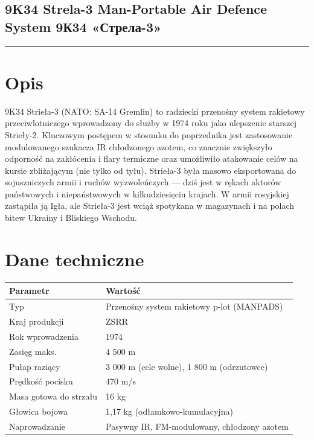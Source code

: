 \documentclass[12pt,openany,oneside]{book}
\begin{document}
\subsection{9K34 Strela-3 Man-Portable Air Defence System \textbar{}
9К34
«Стрела-3»}\label{k34-strela-3-man-portable-air-defence-system-9ux43a34-ux441ux442ux440ux435ux43bux430-3}

\begin{center}\rule{0.5\linewidth}{0.5pt}\end{center}

\section{Opis}\label{opis-31}

9K34 Strieła-3 (NATO: SA-14 Gremlin) to radziecki przenośny system
rakietowy przeciwlotniczego wprowadzony do służby w 1974 roku jako
ulepszenie starszej Strieły-2. Kluczowym postępem w stosunku do
poprzednika jest zastosowanie modulowanego szukacza IR chłodzonego
azotem, co znacznie zwiększyło odporność na zakłócenia i flary termiczne
oraz umożliwiło atakowanie celów na kursie zbliżającym (nie tylko od
tyłu). Strieła-3 była masowo eksportowana do sojuszniczych armii i
ruchów wyzwoleńczych --- dziś jest w rękach aktorów państwowych i
niepaństwowych w kilkudziesięciu krajach. W armii rosyjskiej zastąpiła
ją Igła, ale Strieła-3 jest wciąż spotykana w magazynach i na polach
bitew Ukrainy i Bliskiego Wschodu.

\section{Dane techniczne}\label{dane-techniczne-31}

\begin{longtable}[]{@{}ll@{}}
\toprule\noalign{}
Parametr & Wartość \\
\midrule\noalign{}
\endhead
\bottomrule\noalign{}
\endlastfoot
Typ & Przenośny system rakietowy p-lot (MANPADS) \\
Kraj produkcji & ZSRR \\
Rok wprowadzenia & 1974 \\
Zasięg maks. & 4 500 m \\
Pułap raziący & 3 000 m (cele wolne), 1 800 m (odrzutowce) \\
Prędkość pocisku & 470 m/s \\
Masa gotowa do strzału & 16 kg \\
Głowica bojowa & 1,17 kg (odłamkowo-kumulacyjna) \\
Naprowadzanie & Pasywny IR, FM-modulowany, chłodzony azotem \\
\end{longtable}
\end{document}
